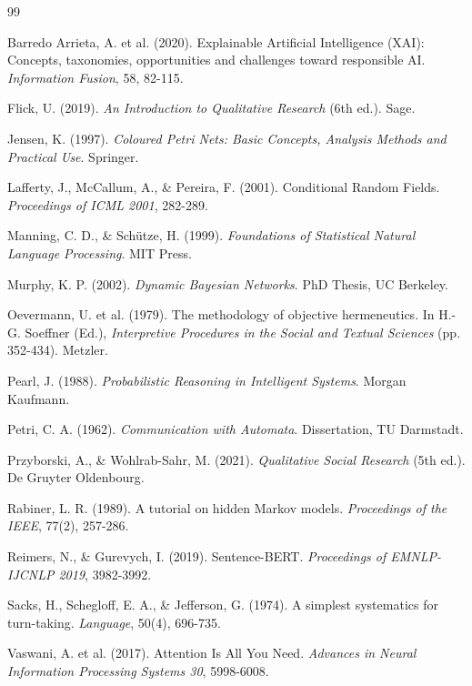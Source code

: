 \documentclass[12pt,a4paper]{article}
\begin{document}
\newpage
\begin{thebibliography}{99}

Barredo Arrieta, A. et al. (2020). Explainable Artificial Intelligence (XAI): Concepts, taxonomies, opportunities and challenges toward responsible AI. \textit{Information Fusion}, 58, 82-115.

Flick, U. (2019). \textit{An Introduction to Qualitative Research} (6th ed.). Sage.

Jensen, K. (1997). \textit{Coloured Petri Nets: Basic Concepts, Analysis Methods and Practical Use}. Springer.

Lafferty, J., McCallum, A., \& Pereira, F. (2001). Conditional Random Fields. \textit{Proceedings of ICML 2001}, 282-289.

Manning, C. D., \& Schütze, H. (1999). \textit{Foundations of Statistical Natural Language Processing}. MIT Press.

Murphy, K. P. (2002). \textit{Dynamic Bayesian Networks}. PhD Thesis, UC Berkeley.

Oevermann, U. et al. (1979). The methodology of objective hermeneutics. In H.-G. Soeffner (Ed.), \textit{Interpretive Procedures in the Social and Textual Sciences} (pp. 352-434). Metzler.

Pearl, J. (1988). \textit{Probabilistic Reasoning in Intelligent Systems}. Morgan Kaufmann.

Petri, C. A. (1962). \textit{Communication with Automata}. Dissertation, TU Darmstadt.

Przyborski, A., \& Wohlrab-Sahr, M. (2021). \textit{Qualitative Social Research} (5th ed.). De Gruyter Oldenbourg.

Rabiner, L. R. (1989). A tutorial on hidden Markov models. \textit{Proceedings of the IEEE}, 77(2), 257-286.

Reimers, N., \& Gurevych, I. (2019). Sentence-BERT. \textit{Proceedings of EMNLP-IJCNLP 2019}, 3982-3992.

Sacks, H., Schegloff, E. A., \& Jefferson, G. (1974). A simplest systematics for turn-taking. \textit{Language}, 50(4), 696-735.

Vaswani, A. et al. (2017). Attention Is All You Need. \textit{Advances in Neural Information Processing Systems 30}, 5998-6008.

\end{thebibliography}
\end{document}
